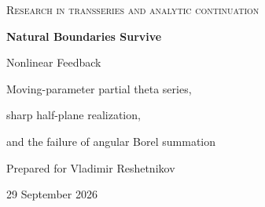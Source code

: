 \documentclass[11pt,a4paper]{article}
\numberwithin{equation}{section}
\theoremstyle{definition}\newtheorem{definition}[theorem]{Definition}
\theoremstyle{remark}\newtheorem{remark}[theorem]{Remark}
\theoremstyle{definition}
\newcommand{\Uhat}{\widehat U}\newcommand{\Qhat}{\widehat Q}
\begin{document}
\hypersetup{pageanchor=false}
\begin{titlepage}
\centering\vspace*{10mm}
{\small\scshape Research in transseries and analytic continuation\par}
\vspace{9mm}
{\LARGE\bfseries Natural Boundaries Survive\par Nonlinear Feedback\par}
\vspace{7mm}
{\Large Moving-parameter partial theta series,\par sharp half-plane realization,\par and the failure of angular Borel summation\par}
\vspace{11mm}
{\large Prepared for Vladimir Reshetnikov\par}
\vspace{3mm}29 September 2026
\vspace{10mm}
\begin{minipage}{0.94\textwidth}
\begin{abstract}
For an integer $d\ge2$, consider the formally well-defined equation
\[
 \Uhat_d(q)=\sum_{j\ge1}q^j\exp\!\bigl(j^d\Uhat_d(q)\bigr)
\]
and its compositional inverse $\Qhat_d$. We prove that the canonical actual
inverse $Q_d$, holomorphic in a sufficiently small left half-disc and smooth
up to its diameter, has that entire imaginary diameter as a natural boundary.
The obstruction survives analytic changes of the moving parameter, analytic
changes of the level set, and finite modifications of the feedback kernel.
The main tool is an explicit large-order theorem: periodic geometric moments
retain factorial growth after substitution along an arbitrary holomorphic
curve. A mean-square argument treats tied nearest poles without assuming a
unique dominant singularity.


\end{abstract}
\end{minipage}
\end{titlepage}
\end{document}
